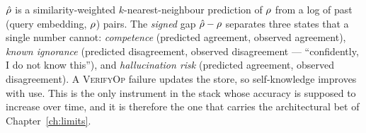 \begin{remark}\label{rem:rhohat}
$\hat{\rho}$ is a similarity-weighted $k$-nearest-neighbour
prediction of $\rho$ from a log of past (query embedding,
$\rho$) pairs. The \emph{signed} gap $\hat{\rho}-\rho$
separates three states that a single number cannot: \emph{competence}
(predicted agreement, observed agreement), \emph{known ignorance}
(predicted disagreement, observed disagreement --- ``confidently, I do
not know this''), and \emph{hallucination risk} (predicted agreement,
observed disagreement). A \textsc{VerifyOp} failure updates the store,
so self-knowledge improves with use. This is the only instrument in the
stack whose accuracy is supposed to increase over time, and it is
therefore the one that carries the architectural bet of
Chapter~\ref{ch:limits}.
\end{remark}
